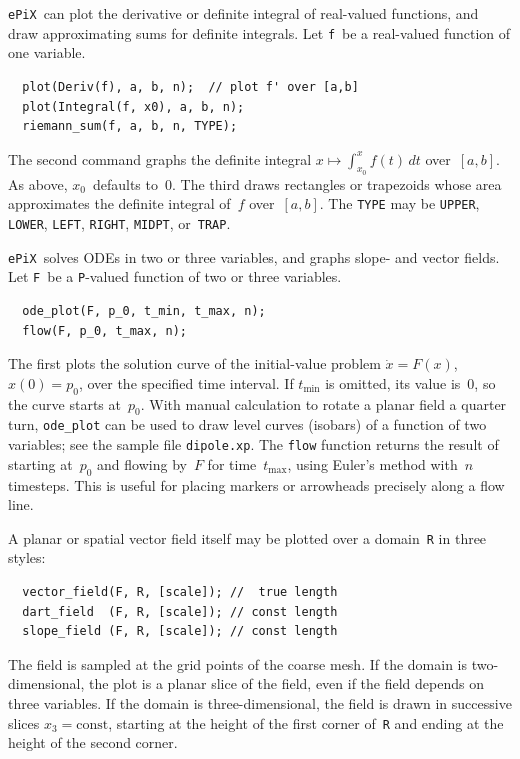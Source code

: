 \documentclass[12pt]{report}
\newcommand{\code}[1]{\texttt{#1}}
\newcommand{\filename}[1]{\texttt{#1}}
\newcommand{\ePiX}{\code{ePiX}}
\begin{document}
\ePiX\ can plot the derivative or definite integral of real-valued
functions, and draw approximating sums for definite integrals. Let
\code{f}~be a real-valued function of one variable.
\begin{verbatim}
  plot(Deriv(f), a, b, n);  // plot f' over [a,b]
  plot(Integral(f, x0), a, b, n);
  riemann_sum(f, a, b, n, TYPE);
\end{verbatim}
The second command graphs the definite integral $x\mapsto\int_{x_0}^x
f(t)\,dt$ over~$[a,b]$. As above, $x_0$~defaults to~0. The third
draws rectangles or trapezoids whose area approximates the definite
integral of~$f$ over~$[a,b]$. The \code{TYPE} may be \code{UPPER},
\code{LOWER}, \code{LEFT}, \code{RIGHT}, \code{MIDPT},
or~\code{TRAP}.

\ePiX\ solves ODEs in two or three variables, and graphs slope- and
vector fields. Let \code{F}~be a \code{P}-valued function of two or
three variables.
\begin{verbatim}
  ode_plot(F, p_0, t_min, t_max, n); 
  flow(F, p_0, t_max, n);
\end{verbatim}
The first plots the solution curve of the initial-value problem
$\dot{x}=F(x)$, $x(0)=p_0$, over the specified time interval.  If
$t_\mathrm{min}$ is omitted, its value is~0, so the curve starts
at~$p_0$. With manual calculation to rotate a planar field a quarter
turn, \code{ode\_plot} can be used to draw level curves (isobars) of a
function of two variables; see the sample file \filename{dipole.xp}.
 The \code{flow}
function returns the result of starting at~$p_0$ and flowing by~$F$
for time~$t_\mathrm{max}$, using Euler's method with~$n$ timesteps.
This is useful for placing markers or arrowheads precisely along a
flow line.

A planar or spatial vector field itself may be plotted over a
domain~\code{R} in three styles:
\begin{verbatim}
  vector_field(F, R, [scale]); //  true length
  dart_field  (F, R, [scale]); // const length
  slope_field (F, R, [scale]); // const length
\end{verbatim}
The field is sampled at the grid points of the coarse mesh. If the
domain is two-dimensional, the plot is a planar slice of the field,
even if the field depends on three variables. If the domain is
three-dimensional, the field is drawn in successive slices
$x_3=\mathrm{const}$, starting at the height of the first corner
of~\code{R} and ending at the height of the second corner.
\end{document}

